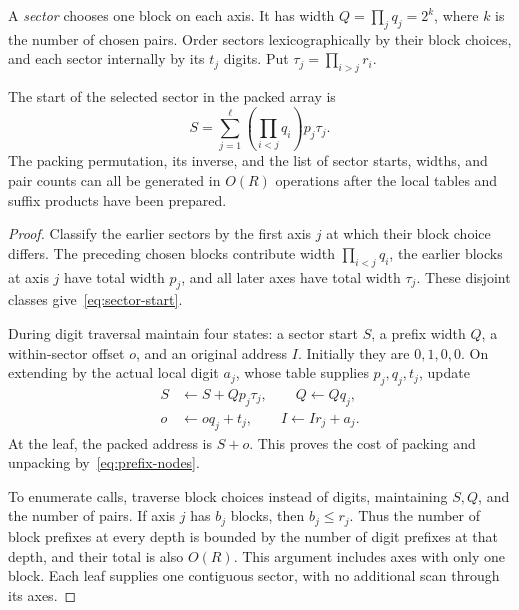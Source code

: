 A \emph{sector} chooses one block on each axis. It has width $Q=\prod_jq_j=2^k$, where $k$ is the number of chosen pairs. Order sectors lexicographically by their block choices, and each sector internally by its $t_j$ digits. Put $\tau_j=\prod_{i>j}r_i$.

\begin{samepage}
\begin{lemma}\label{lem:sector-address}
The start of the selected sector in the packed array is
\begin{equation}\label{eq:sector-start}
 S=\sum_{j=1}^{\ell}\left(\prod_{i<j}q_i\right)p_j\tau_j.
\end{equation}
The packing permutation, its inverse, and the list of sector starts, widths, and pair counts can all be generated in $O(R)$ operations after the local tables and suffix products have been prepared.
\end{lemma}
\end{samepage}
\begin{proof}
Classify the earlier sectors by the first axis $j$ at which their block choice differs. The preceding chosen blocks contribute width $\prod_{i<j}q_i$, the earlier blocks at axis $j$ have total width $p_j$, and all later axes have total width $\tau_j$. These disjoint classes give~\eqref{eq:sector-start}.

During digit traversal maintain four states: a sector start $S$, a prefix width $Q$, a within-sector offset $o$, and an original address $I$. Initially they are $0,1,0,0$. On extending by the actual local digit $a_j$, whose table supplies $p_j,q_j,t_j$, update
\begin{equation}\label{eq:sector-updates}
 \begin{split}
 S&\leftarrow S+Qp_j\tau_j,\qquad Q\leftarrow Qq_j,\\
 o&\leftarrow oq_j+t_j,\qquad I\leftarrow Ir_j+a_j.
 \end{split}
\end{equation}
At the leaf, the packed address is $S+o$. This proves the cost of packing and unpacking by~\eqref{eq:prefix-nodes}.

To enumerate calls, traverse block choices instead of digits, maintaining $S,Q$, and the number of pairs. If axis $j$ has $b_j$ blocks, then $b_j\le r_j$. Thus the number of block prefixes at every depth is bounded by the number of digit prefixes at that depth, and their total is also $O(R)$. This argument includes axes with only one block. Each leaf supplies one contiguous sector, with no additional scan through its axes.
\end{proof}

